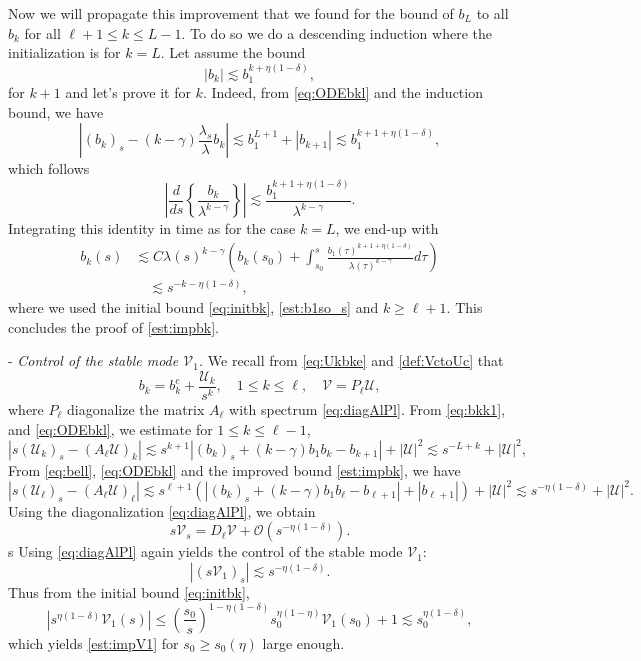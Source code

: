 \documentclass[11pt]{aims}
\theoremstyle{definition}
\numberwithin{equation}{section}
\begin{document}
Now we will propagate this improvement that we found for the bound of $b_L$ to all $b_k$ for all $\ell + 1 \leq k \leq L - 1$. To do so we do a descending induction where the initialization is for $k=L$. Let assume  the bound 
$$|b_k|\lesssim  b_1^{k + \eta(1 - \delta)},$$
for $k+1$ and let's prove it for $k$. 
Indeed, from \eqref{eq:ODEbkl} and the induction bound, we have 
$$\left|(b_k)_s - (k - \gamma)\frac{\lambda_s}{\lambda}b_k\right| \lesssim b_1^{L + 1} + |b_{k + 1}| \lesssim b_1^{k + 1 + \eta(1 - \delta)},$$
which follows
$$\left|\frac{d}{ds}\left\{\frac{b_k}{\lambda^{k - \gamma}}\right\} \right| \lesssim \frac{b_1^{k + 1 + \eta(1 - \delta)}}{\lambda^{k - \gamma}}.$$
Integrating this identity in time as for the case $k = L$, we end-up with 
\begin{align*}
b_k(s) &\lesssim C\lambda(s)^{k - \gamma}\left(b_k(s_0) + \int_{s_0}^s\frac{b_1(\tau)^{k + 1 + \eta(1 - \delta)}}{\lambda(\tau)^{k - \gamma}} d\tau\right)\\
&\quad \lesssim s^{-k - \eta(1 - \delta)},
\end{align*}
where we used the initial bound \eqref{eq:initbk}, \eqref{est:b1so_s} and $k \geq \ell + 1$. This concludes the proof of \eqref{est:impbk}.

\noindent - \textit{Control of the stable mode ${\mathcal{V}}_1$.} We recall from \eqref{eq:Ukbke} and \eqref{def:VctoUc} that 
$$b_k = b_k^e + \frac{{\mathcal{U}}_k}{s^k}, \quad 1 \leq k \leq \ell, \quad {\mathcal{V}} = P_\ell {\mathcal{U}},$$
where $P_\ell$ diagonalize the matrix $A_\ell$ with spectrum \eqref{eq:diagAlPl}. From \eqref{eq:bkk1}, and \eqref{eq:ODEbkl}, we estimate for $1 \leq k \leq \ell - 1$, 
$$|s({\mathcal{U}}_k)_s - (A_\ell {\mathcal{U}})_k| \lesssim s^{k + 1}|(b_k)_s + (k - \gamma)b_1 b_k - b_{k + 1}| + |{\mathcal{U}}|^2 \lesssim s^{-L + k} + |{\mathcal{U}}|^2,$$
From \eqref{eq:bell}, \eqref{eq:ODEbkl} and the improved bound \eqref{est:impbk}, we have 
$$|s({\mathcal{U}}_\ell)_s - (A_\ell {\mathcal{U}})_\ell| \lesssim s^{\ell + 1}\left(|(b_k)_s + (k - \gamma)b_1 b_\ell - b_{\ell + 1}| + |b_{\ell + 1}|\right) + |{\mathcal{U}}|^2 \lesssim s^{-\eta(1 - \delta)} + |{\mathcal{U}}|^2.$$
Using the diagonalization \eqref{eq:diagAlPl}, we obtain 
\begin{equation}\label{eq:sVs}
s{\mathcal{V}}_s = D_\ell {\mathcal{V}} + {\mathcal{O}}(s^{-\eta(1 - \delta)}).
\end{equation}
s
Using \eqref{eq:diagAlPl} again yields the control of the stable mode ${\mathcal{V}}_1$:
$$|(s{\mathcal{V}}_1)_s| \lesssim s^{-\eta(1 - \delta)}.$$
Thus from the initial bound \eqref{eq:initbk}, 
$$|s^{\eta(1 - \delta)}{\mathcal{V}}_1(s)| \leq \left(\frac{s_0}{s}\right)^{1 - \eta(1 - \delta)}s_0^{\eta(1 - \eta)}{\mathcal{V}}_1(s_0) + 1\lesssim s_0^{\eta(1 - \delta)},$$
which yields \eqref{est:impV1} for $s_0 \geq s_0(\eta)$ large enough.\\
\end{document}
